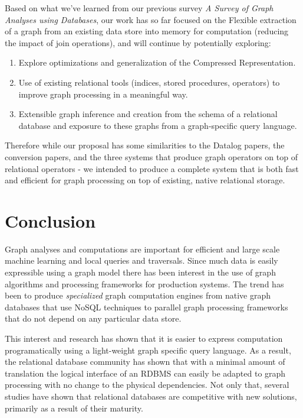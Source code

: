 \documentclass[11pt,letterpaper]{article}
\begin{document}
Based on what we've learned from our previous survey \textit{A Survey of Graph Analyses using Databases}, our work has so far focused on the Flexible extraction of a graph from an existing data store into memory for computation (reducing the impact of join operations), and will continue by potentially exploring:

\begin{enumerate}
	\item Explore optimizations and generalization of the Compressed Representation.
	\item Use of existing relational tools (indices, stored procedures, operators) to improve graph processing in a meaningful way.
	\item Extensible graph inference and creation from the schema of a relational database and exposure to these graphs from a graph-specific query language.
\end{enumerate}

Therefore while our proposal has some similarities to the Datalog papers, the conversion papers, and the three systems that produce graph operators on top of relational operators - we intended to produce a complete system that is both fast and efficient for graph processing on top of existing, native relational storage.

\section*{Conclusion}

Graph analyses and computations are important for efficient and large scale machine learning and local queries and traversals. Since much data is easily expressible using a graph model there has been interest in the use of graph algorithms and processing frameworks for production systems. The trend has been to produce \textit{specialized} graph computation engines from native graph databases that use NoSQL techniques to parallel graph processing frameworks that do not depend on any particular data store.

This interest and research has shown that it is easier to express computation programatically using a light-weight graph specific query language. As a result, the relational database community has shown that with a minimal amount of translation the logical interface of an RDBMS can easily be adapted to graph processing with no change to the physical dependencies. Not only that, several studies have shown that relational databases are competitive with new solutions, primarily as a result of their maturity.
\end{document}
